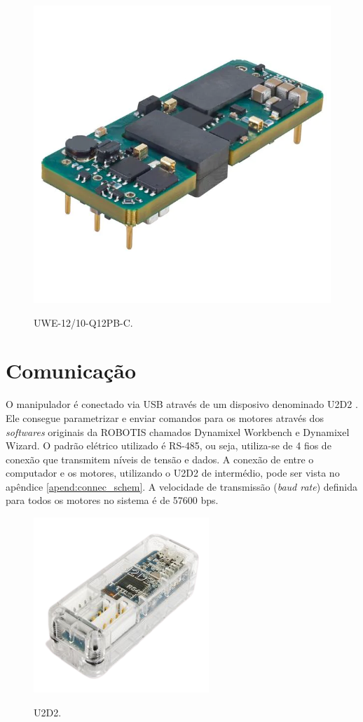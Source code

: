 \begin{figure}[H]
    \centering
    \caption{UWE-12/10-Q12PB-C.}
    \includegraphics[scale=0.20]{images/dcdc.png}
    \label{fig:dcdcimg}
\end{figure}

\section{Comunicação}

O manipulador é conectado via USB através de um disposivo denominado U2D2 \cite{u2d2}. Ele consegue parametrizar e enviar comandos para os motores através dos \textit{softwares} originais da ROBOTIS chamados Dynamixel Workbench e Dynamixel Wizard. O padrão elétrico utilizado é RS-485, ou seja, utiliza-se de 4 fios de conexão que transmitem níveis de tensão e dados. A conexão de entre o computador e os motores, utilizando o U2D2 de intermédio, pode ser vista no apêndice \ref{apend:connec_schem}. A velocidade de transmissão (\textit{baud rate}) definida para todos os motores no sistema é de 57600 bps.

\begin{figure}[H]
    \centering
    \caption{U2D2.}
    \includegraphics[scale=0.70]{images/u2d2.png}
    \label{fig:u2d2img}
\end{figure}


